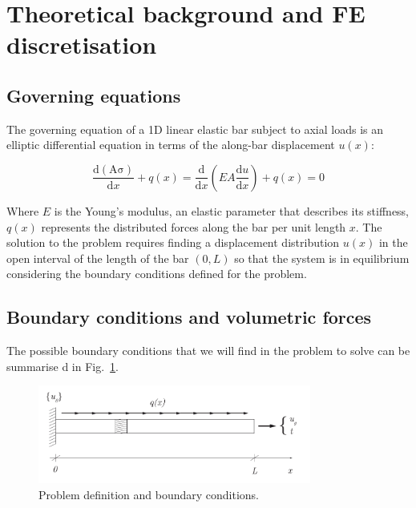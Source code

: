 \documentclass[spanish,a4paper,12pt]{article}
\begin{document}
\section{Theoretical background and FE discretisation}
\label{sec:teoria}

\subsection{Governing equations}

The governing equation of a 1D linear elastic bar subject to axial loads is an elliptic differential equation in terms of the along-bar displacement \(u(x)\):

\begin{equation}\label{eq:gov}
\frac{\mathrm{d (A \sigma)}}{\mathrm{d} x} + q(x)
=\frac{\mathrm{d}}{\mathrm{d} x}\left(EA \frac{\mathrm{d} u}{\mathrm{d} x}\right)+q(x)=0
\end{equation}

Where $E$ is the Young's modulus, an elastic parameter that describes its stiffness, $q(x)$ represents the distributed forces along the bar per unit length $x$. The solution to the problem requires finding a displacement distribution \(u(x)\) in the open interval of the length of the bar $(0,L)$ so that the system is in equilibrium considering the boundary conditions defined for the problem.

\subsection{Boundary conditions and volumetric forces}

The possible boundary conditions that we will find in the problem to solve can be summarise d in Fig.~\ref{fig:CC1D}.

\begin{figure}[!htp]
\centering
\includegraphics[width=0.8\textwidth]{figuras/1D.pdf}
\caption{Problem definition and boundary conditions.}
\label{fig:CC1D}
\end{figure}
\end{document}

